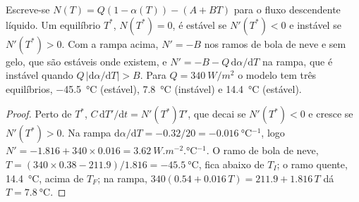 \begin{proposition}\label{prop:b3:climate-models:three}
Escreve-se $N(T) = Q(1 - \alpha(T)) - (A + BT)$ para o fluxo descendente líquido. Um
equilíbrio $T^*$, $N(T^*) = 0$, é estável se $N'(T^*) < 0$ e instável se
$N'(T^*) > 0$. Com a rampa acima, $N' = -B$ nos ramos de bola de neve e
sem gelo, que são estáveis onde existem, e $N' = -B -
Q\,\mathrm d\alpha/\mathrm dT$ na rampa, que é instável quando $Q\,
|\mathrm d\alpha/\mathrm dT| > B$. Para $Q = \qty{340}{W/m^2}$ o modelo tem
três equilíbrios, \qty{-45.5}{\celsius} (estável), \qty{7.8}{\celsius}
(instável) e \qty{14.4}{\celsius} (estável).
\end{proposition}

\begin{proof}
Perto de $T^*$, $C\,\mathrm dT'/\mathrm dt = N'(T^*)T'$, que decai se
$N'(T^*) < 0$ e cresce se $N'(T^*) > 0$. Na rampa $\mathrm d\alpha/
\mathrm dT = -0.32/20 = \qty{-0.016}{\celsius^{-1}}$, logo $N' = -1.816 + 340
\times 0.016 = \qty{+3.62}{W.m^{-2}.\celsius^{-1}}$. O ramo de bola de neve,
$T = (340\times0.38 - 211.9)/1.816 = \qty{-45.5}{\celsius}$, fica abaixo de
$T_I$; o ramo quente, \qty{14.4}{\celsius}, acima de $T_F$; na rampa,
$340(0.54 + 0.016\,T) = 211.9 + 1.816\,T$ dá $T = \qty{7.8}{\celsius}$.
\end{proof}

